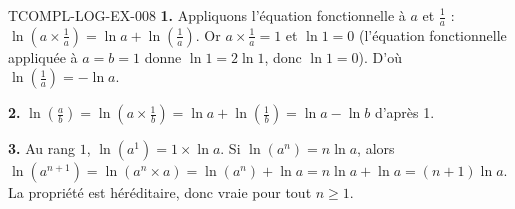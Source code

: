 \begin{corrige}{TCOMPL-LOG-EX-008}
\textbf{1.} Appliquons l'équation fonctionnelle à $a$ et $\tfrac1a$ :
$\ln\!\left(a\times\tfrac1a\right)=\ln a+\ln\!\left(\tfrac1a\right)$. Or
$a\times\tfrac1a=1$ et $\ln1=0$ (l'équation fonctionnelle appliquée à
$a=b=1$ donne $\ln1=2\ln1$, donc $\ln1=0$). D'où
$\ln\!\left(\tfrac1a\right)=-\ln a$.

\textbf{2.} $\ln\!\left(\tfrac ab\right)=\ln\!\left(a\times\tfrac1b\right)
=\ln a+\ln\!\left(\tfrac1b\right)=\ln a-\ln b$ d'après 1.

\textbf{3.} Au rang $1$, $\ln(a^1)=1\times\ln a$. Si $\ln(a^n)=n\ln a$, alors
$\ln(a^{n+1})=\ln(a^n\times a)=\ln(a^n)+\ln a=n\ln a+\ln a=(n+1)\ln a$. La
propriété est héréditaire, donc vraie pour tout $n\geq1$.
\end{corrige}

